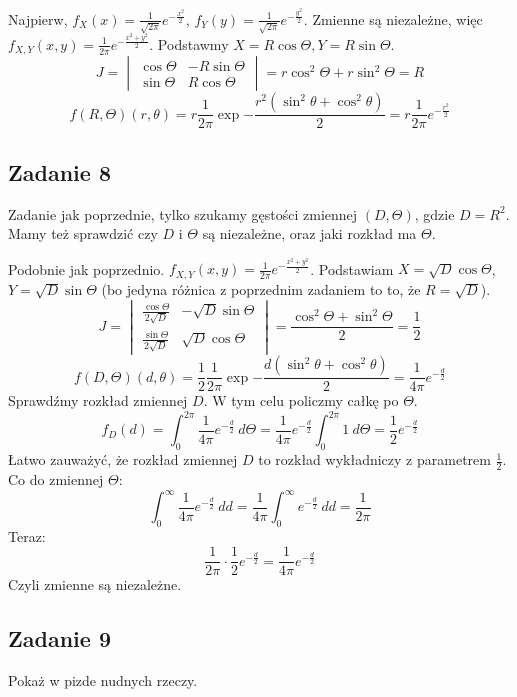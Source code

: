 \documentclass[a4paper]{article}
\begin{document}
Najpierw, $f_X(x)=\frac{1}{\sqrt{2\pi}}e^{-\frac{x^2}{2}}$, $f_Y(y)=\frac{1}{\sqrt{2\pi}}e^{-\frac{y^2}{2}}$. 
Zmienne są niezależne, więc $f_{X,Y}(x,y)=\frac{1}{2\pi}e^{-\frac{x^2+y^2}{2}}$.
Podstawmy $X = R \cos{\Theta}, Y = R \sin{\Theta}$.
$$J=\begin{vmatrix}
\cos{\Theta} & -R\sin{\Theta}\\
\sin{\Theta} & R\cos{\Theta}
\end{vmatrix}=r\cos^2{\Theta}+r\sin^2{\Theta} = R $$
$$f(R,\Theta)(r,\theta)= r\frac{1}{2\pi} \exp{-\frac{r^2(\sin^2\theta+\cos^2\theta)}{2}}= r\frac{1}{2\pi} e^{-\frac{r^2}{2}} $$

\subsection*{Zadanie 8}
Zadanie jak poprzednie, tylko szukamy gęstości zmiennej $(D,\Theta)$, gdzie $D=R^2$. Mamy też sprawdzić czy $D$ i $\Theta$ są niezależne, oraz jaki rozkład ma $\Theta$.

Podobnie jak poprzednio. $f_{X,Y}(x,y)=\frac{1}{2\pi}e^{-\frac{x^2+y^2}{2}}$.
Podstawiam $X=\sqrt{D}\cos{\Theta}$, $Y=\sqrt{D}\sin{\Theta}$ (bo jedyna różnica z poprzednim zadaniem to to, że $R=\sqrt{D}$).
$$J=\begin{vmatrix}
\frac{\cos{\Theta}}{2\sqrt{D}} & -\sqrt{D}\sin{\Theta}\\
\frac{\sin{\Theta}}{2\sqrt{D}} & \sqrt{D}\cos{\Theta}
\end{vmatrix}=\frac{\cos^2{\Theta}+\sin^2{\Theta}}{2} = \frac{1}{2} $$
$$f(D,\Theta)(d,\theta)= \frac{1}{2}\frac{1}{2\pi} \exp{-\frac{d(\sin^2\theta+\cos^2\theta)}{2}}= \frac{1}{4\pi} e^{-\frac{d}{2}}  $$
Sprawdźmy rozkład zmiennej $D$. W tym celu policzmy całkę po $\Theta$.
$$f_D(d)=\int_0^{2\pi} \frac{1}{4\pi} e^{-\frac{d}{2}} \ d\Theta  = \frac{1}{4\pi} e^{-\frac{d}{2}} \int_0^{2\pi} 1 \ d\Theta = \frac{1}{2}e^{-\frac{d}{2}}$$
Łatwo zauważyć, że rozkład zmiennej $D$ to rozkład wykładniczy z parametrem $\frac{1}{2}$. Co do zmiennej $\Theta$:
$$\int_0^\infty \frac{1}{4\pi} e^{-\frac{d}{2}} \ dd = \frac{1}{4\pi} \int_0^\infty e^{-\frac{d}{2}} \ dd = \frac{1}{2\pi}$$
Teraz: 
$$\frac{1}{2\pi} \cdot \frac{1}{2}e^{-\frac{d}{2}}=\frac{1}{4\pi}e^{-\frac{d}{2}}$$
Czyli zmienne są niezależne.

\subsection*{Zadanie 9}
Pokaż w pizde nudnych rzeczy.
\end{document}
